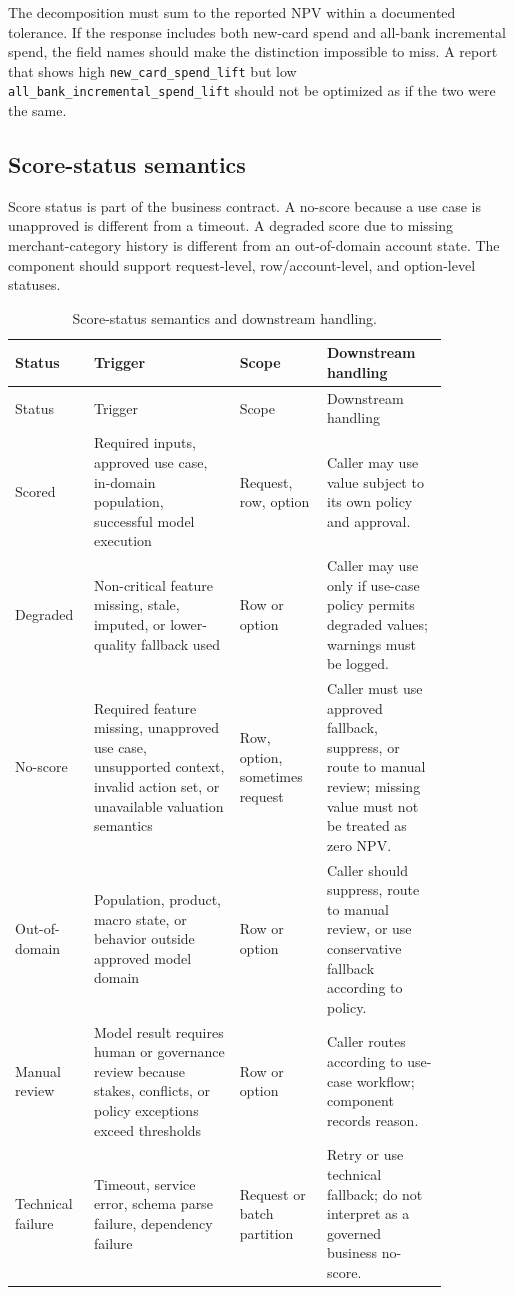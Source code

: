 \documentclass[11pt]{article}
\newcommand{\1}{\mathbf{1}}
\newcommand{\code}[1]{\nolinkurl{#1}}
\begin{document}
The decomposition must sum to the reported NPV within a documented tolerance.
If the response includes both new-card spend and all-bank incremental spend,
the field names should make the distinction impossible to miss. A report that
shows high \code{new_card_spend_lift} but low
\code{all_bank_incremental_spend_lift} should not be optimized as if the two
were the same.

\subsection{Score-status semantics}
\label{subsec:score-status}

Score status is part of the business contract. A no-score because a use case is
unapproved is different from a timeout. A degraded score due to missing
merchant-category history is different from an out-of-domain account state. The
component should support request-level, row/account-level, and option-level
statuses.

\begin{longtable}{L{0.13\linewidth}L{0.30\linewidth}L{0.18\linewidth}L{0.25\linewidth}}
\caption{Score-status semantics and downstream handling.}
\label{tab:status-semantics}\\
\toprule
Status & Trigger & Scope & Downstream handling \\
\midrule
\endfirsthead
\toprule
Status & Trigger & Scope & Downstream handling \\
\midrule
\endhead
Scored
  & Required inputs, approved use case, in-domain population, successful model
    execution
  & Request, row, option
  & Caller may use value subject to its own policy and approval. \\
Degraded
  & Non-critical feature missing, stale, imputed, or lower-quality fallback used
  & Row or option
  & Caller may use only if use-case policy permits degraded values; warnings
    must be logged. \\
No-score
  & Required feature missing, unapproved use case, unsupported context, invalid
    action set, or unavailable valuation semantics
  & Row, option, sometimes request
  & Caller must use approved fallback, suppress, or route to manual review;
    missing value must not be treated as zero NPV. \\
Out-of-domain
  & Population, product, macro state, or behavior outside approved model domain
  & Row or option
  & Caller should suppress, route to manual review, or use conservative
    fallback according to policy. \\
Manual review
  & Model result requires human or governance review because stakes, conflicts,
    or policy exceptions exceed thresholds
  & Row or option
  & Caller routes according to use-case workflow; component records reason. \\
Technical failure
  & Timeout, service error, schema parse failure, dependency failure
  & Request or batch partition
  & Retry or use technical fallback; do not interpret as a governed business
    no-score. \\
\bottomrule
\end{longtable}
\end{document}
